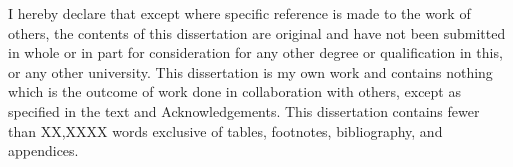 
\begin{declaration}

I hereby declare that except where specific reference is made to the work of
others, the contents of this dissertation are original and have not been
submitted in whole or in part for consideration for any other degree or
qualification in this, or any other university. This dissertation is my own
work and contains nothing which is the outcome of work done in collaboration
with others, except as specified in the text and Acknowledgements. This
dissertation contains fewer than XX,XXXX words exclusive of tables, footnotes, bibliography, and appendices.



\end{declaration}

